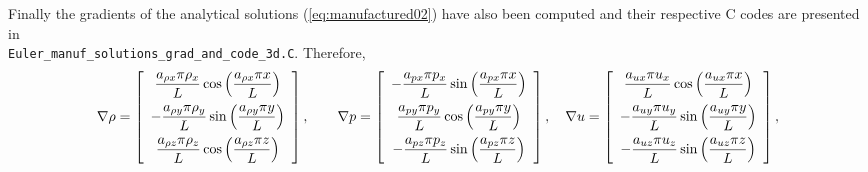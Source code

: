 \documentclass[10pt]{article}
\begin{document}
\begin{landscape}
Finally the gradients of the analytical solutions (\ref{eq:manufactured02}) have also been computed and their respective C codes are presented in \\ \texttt{Euler\_manuf\_solutions\_grad\_and\_code\_3d.C}. Therefore,
\begin{equation}
\nabla  \rho= \left[ \begin{array}{c}
 \dfrac{  a_{\rho x}  \pi \rho_x}{L} \cos\left( \dfrac{ a_{\rho x}  \pi  x}{L}\right)\vspace{5pt} \\
-\dfrac{  a_{\rho y}  \pi \rho_y}{L} \sin\left( \dfrac{ a_{\rho y}  \pi  y}{L}\right)\vspace{5pt}\\
 \dfrac{  a_{\rho z}  \pi \rho_z}{L}  \cos\left( \dfrac{ a_{\rho z}  \pi  z}{L}\right)
\end{array} \right],
\qquad
\nabla p = \left[ \begin{array}{c}
- \dfrac{  a_{px}  \pi p_x}{L} \sin\left( \dfrac{ a_{px}  \pi  x}{L}\right)\vspace{5pt}\\
  \dfrac{  a_{py}  \pi p_y}{L} \cos\left( \dfrac{ a_{py}  \pi  y}{L}\right) \vspace{5pt}\\
- \dfrac{  a_{pz}  \pi p_z}{L} \sin\left( \dfrac{ a_{pz}  \pi  z}{L}\right)
\end{array} \right],
\quad
\nabla u = \left[ \begin{array}{c}
  \dfrac{  a_{ux}  \pi u_x}{L} \cos\left( \dfrac{ a_{ux}  \pi  x}{L}\right)\vspace{5pt}\\
 -   \dfrac{  a_{uy}  \pi u_y}{L} \sin\left( \dfrac{ a_{uy}  \pi  y}{L}\right)\vspace{5pt}\\
 -   \dfrac{  a_{uz}  \pi u_z}{L} \sin\left( \dfrac{ a_{uz}  \pi  z}{L}\right)
\end{array} \right],
\end{equation}


\end{landscape}
\end{document}

